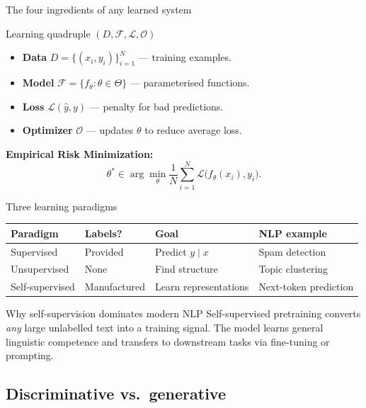 \documentclass[11pt,aspectratio=169]{beamer}
\begin{document}
\begin{frame}{The four ingredients of any learned system}
\begin{block}{Learning quadruple $(D, \mathcal{F}, \mathcal{L}, \mathcal{O})$}
\begin{itemize}
    \item \textbf{Data} $D = \{(x_i, y_i)\}_{i=1}^N$ --- training examples.
    \item \textbf{Model} $\mathcal{F} = \{f_\theta : \theta \in \Theta\}$ --- parameterised functions.
    \item \textbf{Loss} $\mathcal{L}(\hat{y}, y)$ --- penalty for bad predictions.
    \item \textbf{Optimizer} $\mathcal{O}$ --- updates $\theta$ to reduce average loss.
\end{itemize}
\end{block}
\vfill
\textbf{Empirical Risk Minimization:}
\[ \theta^* \in \arg\min_{\theta} \frac{1}{N} \sum_{i=1}^{N} \mathcal{L}\big(f_\theta(x_i), y_i\big). \]
\end{frame}

\begin{frame}{Three learning paradigms}
\begin{center}
\begin{tabular}{|l|l|l|l|}
\hline
\textbf{Paradigm} & \textbf{Labels?} & \textbf{Goal} & \textbf{NLP example} \\
\hline
Supervised & Provided & Predict $y \mid x$ & Spam detection \\
Unsupervised & None & Find structure & Topic clustering \\
Self-supervised & Manufactured & Learn representations & Next-token prediction \\
\hline
\end{tabular}
\end{center}
\vfill
\begin{block}{Why self-supervision dominates modern NLP}
Self-supervised pretraining converts \emph{any} large unlabelled text into a training signal. The model learns general linguistic competence and transfers to downstream tasks via fine-tuning or prompting.
\end{block}
\end{frame}

\subsection{Discriminative vs.\ generative}
\end{document}
